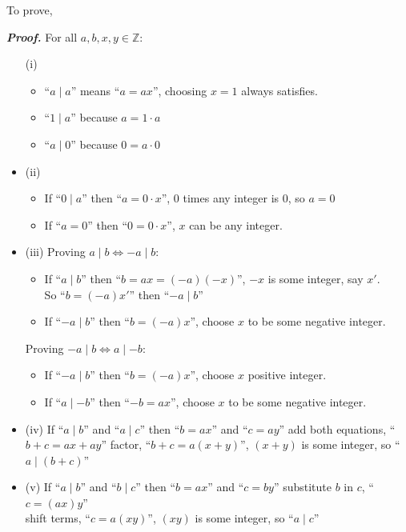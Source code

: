 \noindent
To prove,
\begin{Proof}[Theorem 1.1]
    \textit{\textbf{Proof.}} For all $a, b, x,y \in \mathbb{Z}$:
    \begin{itemize}
        \item[(i)]  \begin {itemize}
        \item ``$a\mid a$'' means ``$a = ax$'', choosing $x = 1$ always satisfies.
        \item ``$1\mid a$'' because $a = 1\cdot a$
        \item ``$a\mid 0$'' because $0 = a\cdot 0$
    \end{itemize}
    \item[(ii)] \begin {itemize}
    \item If ``$0\mid a$'' then ``$a = 0\cdot x$'', 0 times any integer is 0, so $a = 0$
    \item If ``$a = 0$'' then ``$0 = 0\cdot x$'', $x$ can be any integer.
    \end {itemize}

    \noindent
    \item[(iii)]
    Proving $a\mid b \Longleftrightarrow -a\mid b$:
    \begin{itemize}
        \item If ``$a\mid b$'' then ``$b = ax = (-a)(-x)$'', $-x$ is some integer, say $x'$.\\
              So ``$b = (-a)x'$'' then ``$-a\mid b$''
        \item If ``$-a\mid b$'' then ``$b = (-a)x$'', choose $x$ to be some negative integer.\\
    \end{itemize}
    \vspace{-1em}
    Proving $-a\mid b \Longleftrightarrow a\mid -b$:
    \begin{itemize}
        \item If ``$-a\mid b$'' then ``$b = (-a)x$'', choose $x$ positive integer.
        \item If ``$a\mid -b$'' then ``$-b = ax$'', choose $x$ to be some negative integer.
    \end{itemize}
    \item[(iv)] If ``$a\mid b$'' and ``$a\mid c$'' then ``$b = ax$'' and ``$c = ay$'' add both equations, ``$b+c = ax+ay$''
    factor, ``$b+c = a(x+y)$'', $(x+y)$ is some integer, so ``$a\mid (b+c)$''

    \item[(v)] If ``$a\mid b$'' and ``$b\mid c$'' then ``$b = ax$'' and ``$c = by$'' substitute $b$ in $c$, ``$c = (ax)y$''\\
    shift terms, ``$c = a(xy)$'', $(xy)$ is some integer, so ``$a\mid c$''
    \end{itemize}

\end{Proof}